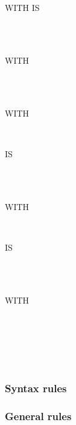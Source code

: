 \begin{syntax}[\miscextcolour]
  WITH  IS
  \begin{1=}
    \identifier \\
    \literal
  \end{1=} \\

  WITH
  \begin{1=}
     \\
  \end{1=} \\

  WITH
  \begin{1=}
     \\
  \end{1=}
  IS
  \begin{1=}
    \identifier \\
    \integer
  \end{1=} \\

  WITH
  \begin{1=}
     \\
  \end{1=}
  IS
  \begin{1=}
    \identifier \\
    \integer
  \end{1=} \\

  WITH 
  \begin{1=}
     \\
  \end{1=}
  \begin{0-1}
    \begin{1=}
      \identifier \\
      \integer
    \end{1=}
    \begin{1=}
       \\
    \end{1=}
  \end{0-1}
\end{syntax}

\subsubsection{Syntax rules}

\subsubsection{General rules}

